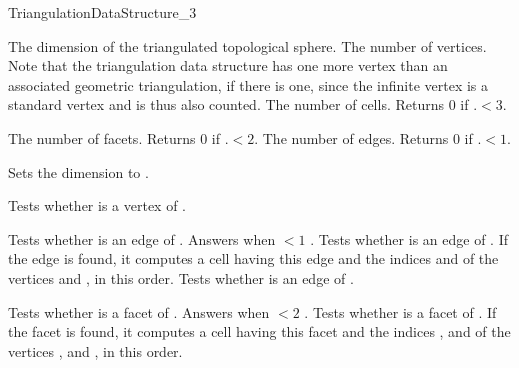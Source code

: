 \begin{ccRefConcept}{TriangulationDataStructure_3}
\ccOperations

\ccAccessFunctions
{}

{The dimension of the triangulated topological sphere.}
\ccGlue
{}
{The number of vertices. Note that the triangulation data structure has one
more vertex than an associated geometric triangulation, if there is
one, since the infinite vertex is a standard vertex and is thus also
counted.} 
\ccGlue
{}
{The number of cells. Returns 0 if \ccVar.$<3$.}

{The number of facets. Returns 0 if \ccVar.$<2$.}
\ccGlue
{}
{The number of edges. Returns 0 if \ccVar.$<1$.}

\begin{ccAdvanced}
{Sets the dimension to .}
\end{ccAdvanced}


{Tests whether  is a vertex of \ccVar.}

{Tests whether  is an edge of \ccVar. Answers  when
 $<1$ .
}
\ccGlue
{}
{Tests whether  is an edge of \ccVar. If the edge is found,
it computes a cell  having this edge and the indices 
and  of the vertices  and , in this order.}
\ccGlue
{}
{Tests whether  is an edge of \ccVar.}

{Tests whether  is a facet of \ccVar. Answers  when
 $<2$ .
}
\ccGlue
{}
{Tests whether  is a facet of \ccVar. If the facet is found,
it computes a cell  having this facet and the indices ,
 and  of the vertices ,  and , in
this order.} 


\end{ccRefConcept}
